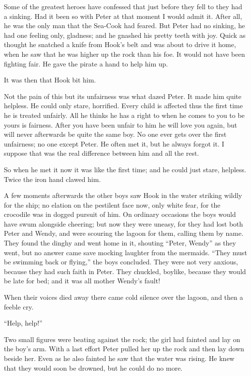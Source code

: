Some of the greatest heroes have confessed that just before they fell
to they had a sinking. Had it been so with Peter at that moment I would
admit it. After all, he was the only man that the Sea-Cook had feared.
But Peter had no sinking, he had one feeling only, gladness; and he
gnashed his pretty teeth with joy. Quick as thought he snatched a knife
from Hook's belt and was about to drive it home, when he saw that he
was higher up the rock than his foe. It would not have been fighting
fair. He gave the pirate a hand to help him up.

It was then that Hook bit him.

Not the pain of this but its unfairness was what dazed Peter. It made
him quite helpless. He could only stare, horrified. Every child is
affected thus the first time he is treated unfairly. All he thinks he
has a right to when he comes to you to be yours is fairness. After you
have been unfair to him he will love you again, but will never
afterwards be quite the same boy. No one ever gets over the first
unfairness; no one except Peter. He often met it, but he always forgot
it. I suppose that was the real difference between him and all the
rest.

So when he met it now it was like the first time; and he could just
stare, helpless. Twice the iron hand clawed him.

A few moments afterwards the other boys saw Hook in the water striking
wildly for the ship; no elation on the pestilent face now, only white
fear, for the crocodile was in dogged pursuit of him. On ordinary
occasions the boys would have swum alongside cheering; but now they
were uneasy, for they had lost both Peter and Wendy, and were scouring
the lagoon for them, calling them by name. They found the dinghy and
went home in it, shouting ``Peter, Wendy'' as they went, but no answer
came save mocking laughter from the mermaids. ``They must be swimming
back or flying,'' the boys concluded. They were not very anxious,
because they had such faith in Peter. They chuckled, boylike, because
they would be late for bed; and it was all mother Wendy's fault!

When their voices died away there came cold silence over the lagoon,
and then a feeble cry.

``Help, help!''

Two small figures were beating against the rock; the girl had fainted
and lay on the boy's arm. With a last effort Peter pulled her up the
rock and then lay down beside her. Even as he also fainted he saw that
the water was rising. He knew that they would soon be drowned, but he
could do no more.

